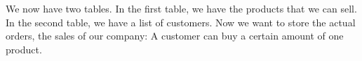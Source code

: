 %
\label{sec:factory:demand}%
%
We now have two tables.
In the first table, we have the products that we can sell.
In the second table, we have a list of customers.
Now we want to store the actual orders, the sales of our company:
A customer can buy a certain amount of one product.%
%
%
%
%
\FloatBarrier%
\endhsection%
%
